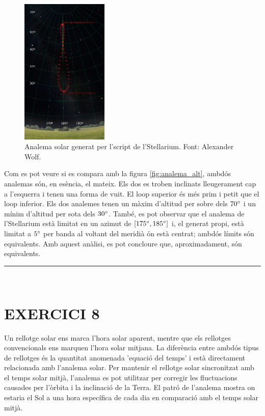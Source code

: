 \documentclass[a4paper, 11pt]{article}
\begin{document}
\vspace{2mm}
\begin{figure} [h!]
    \centering
    \includegraphics[width=0.37\textwidth]{images/analema_real.png}
    \caption{Analema solar generat per l'script de l'Stellarium. Font: Alexander Wolf.}
    \label{fig:analema_real}
\end{figure}
\vspace{2mm}

\noindent Com es pot veure si es compara amb la figura \ref{fig:analema_alt}, ambdós analemas són, en esència, el mateix. Els dos es troben inclinats lleugerament cap a l'esquerra i tenen una forma de vuit. El loop superior és més prim i petit que el loop inferior. Els dos analemes tenen un màxim d'altitud per sobre dels $70 \degree$ i un mínim d'altitud per sota dels $30 \degree$. També, es pot observar que el analema de l'Stellarium està limitat en un azimut de $[175\degree ,185\degree]$ i, el generat propi, està limitat a $5 \degree$ per banda al voltant del meridià ón està centrat; ambdós límits són equivalents. Amb aquest anàlisi, es pot concloure que, aproximadament, són equivalents. 

\vspace{10mm}
\hrule\
\vspace{5mm}


\section*{EXERCICI 8}
\noindent Un rellotge solar ens marca l'hora solar aparent, mentre que els rellotges convencionals ens marquen l'hora solar mitjana. La diferència entre ambdós tipus de rellotges és la quantitat anomenada 'equació del temps' i està directament relacionada amb l'analema solar. Per mantenir el rellotge solar sincronitzat amb el temps solar mitjà, l'analema es pot utilitzar per corregir les fluctuacions causades per l'òrbita i la inclinació de la Terra. El patró de l'analema mostra on estaria el Sol a una hora específica de cada dia en comparació amb el temps solar mitjà.
\end{document}
